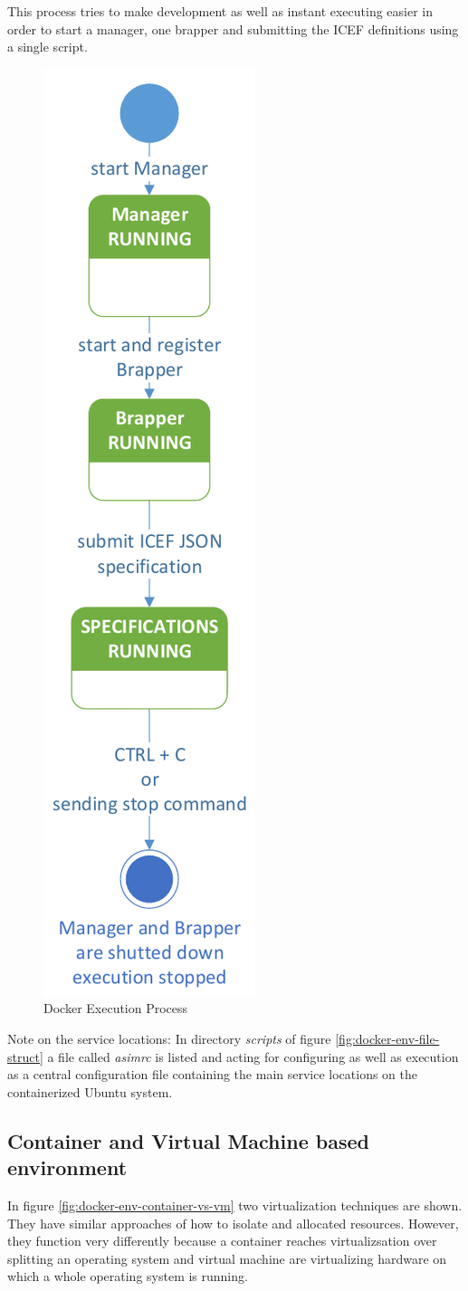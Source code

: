 This process tries to make development as well as instant executing easier in order to start a manager, one brapper and submitting the ICEF definitions using a single script.

\begin{figure}[htbp]
  \centering
  \includegraphics[height=0.9\textwidth, clip, trim=1mm 1mm 1mm 1mm]{Figures/docker_execute}
  \caption{Docker Execution Process}
  \label{fig:docker-env-exec-process}
\end{figure}

Note on the service locations: In directory \textit{scripts} of figure \ref{fig:docker-env-file-struct} a file called \textit{asimrc} is listed and acting for configuring as well as execution as a central configuration file containing the main service locations on the containerized Ubuntu system.

\subsection{Container and Virtual Machine based environment}

In figure \ref{fig:docker-env-container-vs-vm} two virtualization techniques are shown. They have similar approaches of how to isolate and allocated resources. However, they function very differently because a container reaches virtualizsation over splitting an operating system and virtual machine are virtualizing hardware on which a whole operating system is running. 

